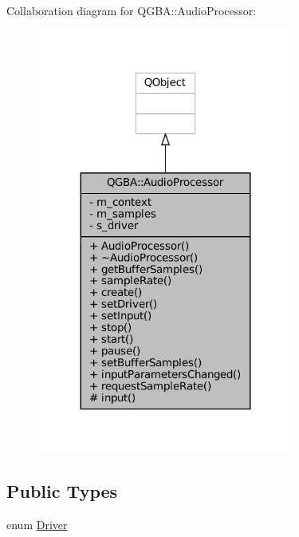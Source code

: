 Collaboration diagram for Q\+G\+BA\+:\+:Audio\+Processor\+:
\nopagebreak
\begin{figure}[H]
\begin{center}
\leavevmode
\includegraphics[width=239pt]{class_q_g_b_a_1_1_audio_processor__coll__graph}
\end{center}
\end{figure}
\subsection*{Public Types}
\begin{DoxyCompactItemize}
\item 
enum \mbox{\hyperlink{class_q_g_b_a_1_1_audio_processor_a49108637a6edef1b593f66701eb9b4bc}{Driver}} 
\end{DoxyCompactItemize}
